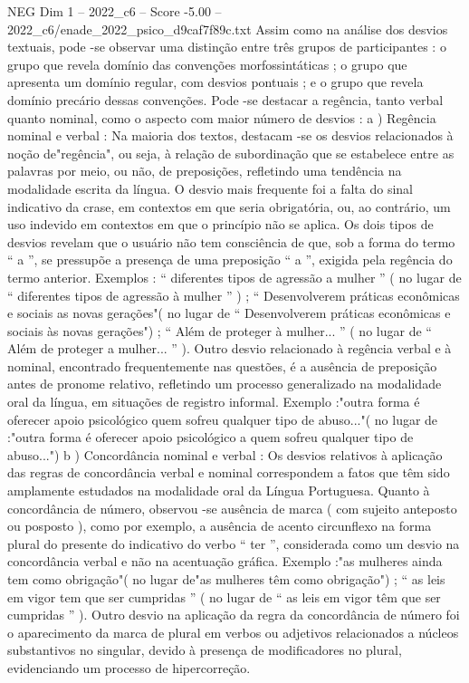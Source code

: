 \begin{textsample}{NEG Dim 1 – 2022\_c6 – Score -5.00 – 2022\_c6/enade\_2022\_psico\_d9caf7f89c.txt}
Assim como na análise dos desvios textuais, pode -se observar uma distinção entre três grupos de participantes : o grupo que revela domínio das convenções morfossintáticas ; o grupo que apresenta um domínio regular, com desvios pontuais ; e o grupo que revela domínio precário dessas convenções.
Pode -se destacar a regência, tanto verbal quanto nominal, como o aspecto com maior número de desvios : a ) Regência nominal e verbal : Na maioria dos textos, destacam -se os desvios relacionados à noção de"regência", ou seja, à relação de subordinação que se estabelece entre as palavras por meio, ou não, de preposições, refletindo uma tendência na modalidade escrita da língua.
O desvio mais frequente foi a falta do sinal indicativo da crase, em contextos em que seria obrigatória, ou, ao contrário, um uso indevido em contextos em que o princípio não se aplica.
Os dois tipos de desvios revelam que o usuário não tem consciência de que, sob a forma do termo “ a ”, se pressupõe a presença de uma preposição “ a ”, exigida pela regência do termo anterior.
Exemplos : “ diferentes tipos de agressão a mulher ” ( no lugar de “ diferentes tipos de agressão à mulher ” ) ; “ Desenvolverem práticas econômicas e sociais as novas gerações"( no lugar de “ Desenvolverem práticas econômicas e sociais às novas gerações") ; “ Além de proteger à mulher... ” ( no lugar de “ Além de proteger a mulher... ” ).
Outro desvio relacionado à regência verbal e à nominal, encontrado frequentemente nas questões, é a ausência de preposição antes de pronome relativo, refletindo um processo generalizado na modalidade oral da língua, em situações de registro informal.
Exemplo :"outra forma é oferecer apoio psicológico quem sofreu qualquer tipo de abuso..."( no lugar de :"outra forma é oferecer apoio psicológico a quem sofreu qualquer tipo de abuso...") b ) Concordância nominal e verbal : Os desvios relativos à aplicação das regras de concordância verbal e nominal correspondem a fatos que têm sido amplamente estudados na modalidade oral da Língua Portuguesa.
Quanto à concordância de número, observou -se ausência de marca ( com sujeito anteposto ou posposto ), como por exemplo, a ausência de acento circunflexo na forma plural do presente do indicativo do verbo “ ter ”, considerada como um desvio na concordância verbal e não na acentuação gráfica.
Exemplo :"as mulheres ainda tem como obrigação"( no lugar de"as mulheres têm como obrigação") ; “ as leis em vigor tem que ser cumpridas ” ( no lugar de “ as leis em vigor têm que ser cumpridas ” ).
Outro desvio na aplicação da regra da concordância de número foi o aparecimento da marca de plural em verbos ou adjetivos relacionados a núcleos substantivos no singular, devido à presença de modificadores no plural, evidenciando um processo de hipercorreção.

\end{textsample}
